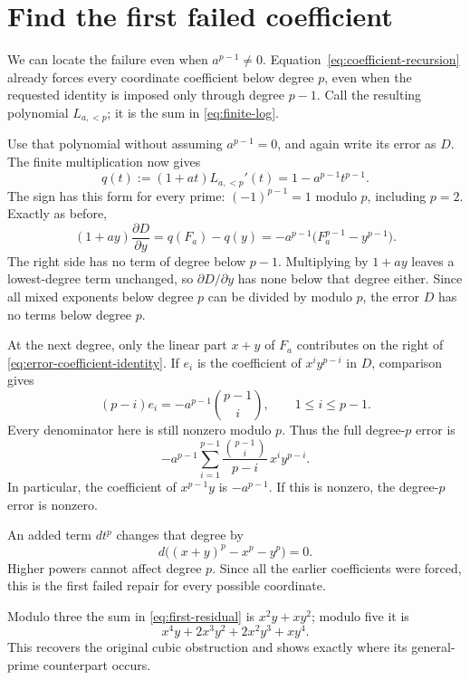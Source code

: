 \section{Find the first failed coefficient}\label{sec:first-obstruction}

We can locate the failure even when \(a^{p-1}\ne0\). Equation~\eqref{eq:coefficient-recursion} already forces every coordinate coefficient below degree \(p\), even when the requested identity is imposed only through degree \(p-1\). Call the resulting polynomial \(L_{a,<p}\); it is the sum in \eqref{eq:finite-log}.

Use that polynomial without assuming \(a^{p-1}=0\), and again write its error as \(D\). The finite multiplication now gives
\[
 q(t):=(1+at)L_{a,<p}'(t)=1-a^{p-1}t^{p-1}.
\]
The sign has this form for every prime: \((-1)^{p-1}=1\) modulo \(p\), including \(p=2\). Exactly as before,
\begin{equation}\label{eq:error-coefficient-identity}
 (1+ay)\frac{\partial D}{\partial y}
 =q(F_a)-q(y)
 =-a^{p-1}\bigl(F_a^{p-1}-y^{p-1}\bigr).
\end{equation}
The right side has no term of degree below \(p-1\). Multiplying by \(1+ay\) leaves a lowest-degree term unchanged, so \(\partial D/\partial y\) has none below that degree either. Since all mixed exponents below degree \(p\) can be divided by modulo \(p\), the error \(D\) has no terms below degree \(p\).

At the next degree, only the linear part \(x+y\) of \(F_a\) contributes on the right of \eqref{eq:error-coefficient-identity}. If \(e_i\) is the coefficient of \(x^iy^{p-i}\) in \(D\), comparison gives
\[
 (p-i)e_i=-a^{p-1}\binom{p-1}{i},\qquad 1\le i\le p-1.
\]
Every denominator here is still nonzero modulo \(p\). Thus the full degree-\(p\) error is
\begin{equation}\label{eq:first-residual}
 -a^{p-1}\sum_{i=1}^{p-1}
 \frac{\binom{p-1}{i}}{p-i}\,x^iy^{p-i}.
\end{equation}
In particular, the coefficient of \(x^{p-1}y\) is \(-a^{p-1}\). If this is nonzero, the degree-\(p\) error is nonzero.

An added term \(d t^p\) changes that degree by
\[
 d\bigl((x+y)^p-x^p-y^p\bigr)=0.
\]
Higher powers cannot affect degree \(p\). Since all the earlier coefficients were forced, this is the first failed repair for every possible coordinate.

Modulo three the sum in \eqref{eq:first-residual} is \(x^2y+xy^2\); modulo five it is
\[
 x^4y+2x^3y^2+2x^2y^3+xy^4.
\]
This recovers the original cubic obstruction and shows exactly where its general-prime counterpart occurs.
